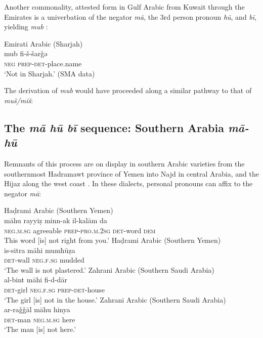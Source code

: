 \documentclass[output=paper,colorlinks,citecolor=brown]{langscibook}
\begin{document}
Another commonality, attested form in Gulf Arabic from Kuwait through the Emirates is a univerbation of the negator \textit{mā}, the 3rd person pronoun \textit{hū}, and \textit{bī}, yielding \textit{mub} \citep[64, 73, 116, 243]{holes1990a}:

\ea Emirati Arabic (Sharjah)\label{ex:WiAR-29}\\
	\gll mub fi-š-šarǧǝ\\
	\textsc{neg} \textsc{prep-det}-place.name\\
	\glt ‘Not in Sharjah.’ (SMA data)
\z

The derivation of \textit{mub} would have proceeded along a similar pathway to that of \textit{muš/miš}:

\begin{exe}\label{ex:WiAR-30}  \end{exe}

\subsection{The \textit{mā hū bī} sequence: Southern Arabia \textit{mā-hū}} \label{s:WiAR-4.3}

Remnants of this process are on display in southern Arabic varieties from the southernmost Hadramawt province of Yemen \citep[185--186]{al-saqqaf1999a} into Najd \citep[44]{ingham1994a} in central Arabia, and the Hijaz along the west coast \citep[41]{omar1975a}. In these dialects, personal pronouns can affix to the negator \textit{mā}:



\ea \label{ex:WiAR-31}
  \ea Haḍrami Arabic (Southern Yemen)\\
  	\gll māhu rayyiẓ minn-ak il-kalām da\\
  	\textsc{neg.m.sg} agreeable \textsc{prep-pro.m.2sg} \textsc{det}-word \textsc{dem}\\
  	\glt This word [is] not right from you.’ \citep[186]{al-saqqaf1999a}
  \ex Haḍrami Arabic (Southern Yemen)\\
  	\gll is-sitra māhi mumħūẓa\\
  	\textsc{det}-wall \textsc{neg.f.sg} mudded\\
	\glt ‘The wall is not plastered.’ \citep[186]{al-saqqaf1999a}
  \ex Zahrani Arabic (Southern Saudi Arabia)\\
  	\gll al-bint māhi fi-d-dār\\
  	\textsc{det}-girl \textsc{neg.f.sg} \textsc{prep-det}-house\\
	\glt ‘The girl [is] not in the house.’ \citep[305]{alzahrani2015a}
  \ex Zahrani Arabic (Southern Saudi Arabia)\\
  	\gll ar-raǧǧāl māhu hinya\\
  	\textsc{det}-man \textsc{neg.m.sg} here\\
  	\glt ‘The man [is] not here.' \citep[307]{alzahrani2015a}
\z \z
\end{document}

